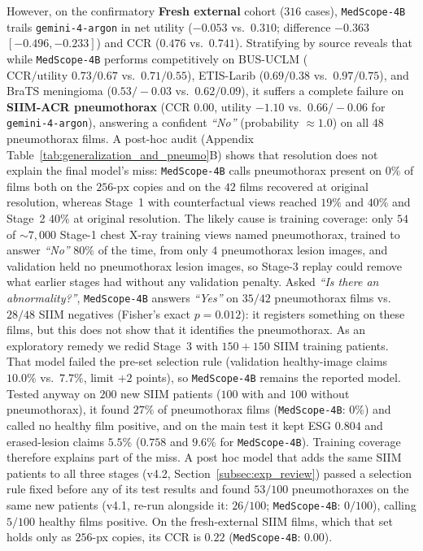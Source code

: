 \documentclass[5p,times,twocolumn,authoryear]{elsarticle}
\begin{document}
However, on the confirmatory \textbf{Fresh external} cohort ($316$ cases), \texttt{MedScope-4B} trails \texttt{gemini-4-argon} in net utility ($-0.053$ vs.\ $0.310$; difference $-0.363$ $[-0.496, -0.233]$) and CCR ($0.476$ vs.\ $0.741$). Stratifying by source reveals that while \texttt{MedScope-4B} performs competitively on BUS-UCLM ($\text{CCR/utility } 0.73 / 0.67$ vs.\ $0.71 / 0.55$), ETIS-Larib ($0.69 / 0.38$ vs.\ $0.97 / 0.75$), and BraTS meningioma ($0.53 / -0.03$ vs.\ $0.62 / 0.09$), it suffers a complete failure on \textbf{SIIM-ACR pneumothorax} ($\text{CCR } 0.00$, utility $-1.10$ vs.\ $0.66 / -0.06$ for \texttt{gemini-4-argon}), answering a confident \emph{``No''} (probability $\approx 1.0$) on all $48$ pneumothorax films. A post-hoc audit (Appendix Table~\ref{tab:generalization_and_pneumo}B) shows that resolution does not explain the final model's miss: \texttt{MedScope-4B} calls pneumothorax present on $0\%$ of films both on the $256\text{-px}$ copies and on the $42$ films recovered at original resolution, whereas Stage~1 with counterfactual views reached $19\%$ and $40\%$ and Stage~2 $40\%$ at original resolution. The likely cause is training coverage: only $54$ of $\sim 7{,}000$ Stage-1 chest X-ray training views named pneumothorax, trained to answer \emph{``No''} $80\%$ of the time, from only $4$ pneumothorax lesion images, and validation held no pneumothorax lesion images, so Stage-3 replay could remove what earlier stages had without any validation penalty. Asked \emph{``Is there an abnormality?''}, \texttt{MedScope-4B} answers \emph{``Yes''} on $35/42$ pneumothorax films vs.\ $28/48$ SIIM negatives (Fisher's exact $p = 0.012$): it registers something on these films, but this does not show that it identifies the pneumothorax. As an exploratory remedy we redid Stage~3 with $150 + 150$ SIIM training patients. That model failed the pre-set selection rule (validation healthy-image claims $10.0\%$ vs.\ $7.7\%$, limit $+2$ points), so \texttt{MedScope-4B} remains the reported model. Tested anyway on $200$ new SIIM patients ($100$ with and $100$ without pneumothorax), it found $27\%$ of pneumothorax films (\texttt{MedScope-4B}: $0\%$) and called no healthy film positive, and on the main test it kept ESG $0.804$ and erased-lesion claims $5.5\%$ ($0.758$ and $9.6\%$ for \texttt{MedScope-4B}). Training coverage therefore explains part of the miss. A post hoc model that adds the same SIIM patients to all three stages (v4.2, Section~\ref{subsec:exp_review}) passed a selection rule fixed before any of its test results and found $53/100$ pneumothoraxes on the same new patients (v4.1, re-run alongside it: $26/100$; \texttt{MedScope-4B}: $0/100$), calling $5/100$ healthy films positive. On the fresh-external SIIM films, which that set holds only as $256$-px copies, its CCR is $0.22$ (\texttt{MedScope-4B}: $0.00$).
\end{document}
